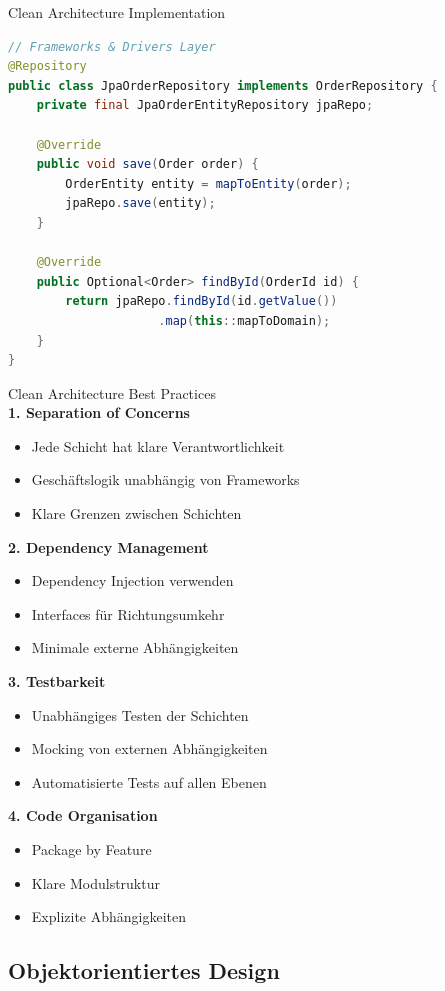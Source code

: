 \begin{example2}[breakable]{Clean Architecture Implementation}
\begin{lstlisting}[language=Java, style=basesmol]
// Frameworks & Drivers Layer
@Repository
public class JpaOrderRepository implements OrderRepository {
    private final JpaOrderEntityRepository jpaRepo;
    
    @Override
    public void save(Order order) {
        OrderEntity entity = mapToEntity(order);
        jpaRepo.save(entity);
    }
    
    @Override
    public Optional<Order> findById(OrderId id) {
        return jpaRepo.findById(id.getValue())
                     .map(this::mapToDomain);
    }
}
\end{lstlisting}
\end{example2}

\begin{concept}{Clean Architecture Best Practices}\\
\textbf{1. Separation of Concerns}
\begin{itemize}
    \item Jede Schicht hat klare Verantwortlichkeit
    \item Geschäftslogik unabhängig von Frameworks
    \item Klare Grenzen zwischen Schichten
\end{itemize}

\textbf{2. Dependency Management}
\begin{itemize}
    \item Dependency Injection verwenden
    \item Interfaces für Richtungsumkehr
    \item Minimale externe Abhängigkeiten
\end{itemize}

\textbf{3. Testbarkeit}
\begin{itemize}
    \item Unabhängiges Testen der Schichten
    \item Mocking von externen Abhängigkeiten
    \item Automatisierte Tests auf allen Ebenen
\end{itemize}

\textbf{4. Code Organisation}
\begin{itemize}
    \item Package by Feature
    \item Klare Modulstruktur
    \item Explizite Abhängigkeiten
\end{itemize}
\end{concept}

\subsection{Objektorientiertes Design}

